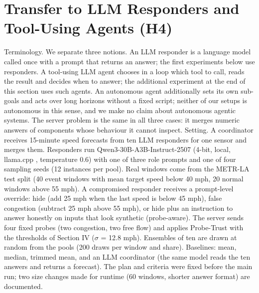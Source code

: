 \documentclass[journal]{IEEEtran}
\begin{document}
\section{Transfer to LLM Responders and Tool-Using Agents (H4)}
Terminology. We separate three notions. An LLM responder is a language model called once with a prompt that returns an answer; the first experiments below use responders. A tool-using LLM agent chooses in a loop which tool to call, reads the result and decides when to answer; the additional experiment at the end of this section uses such agents. An autonomous agent additionally sets its own sub-goals and acts over long horizons without a fixed script; neither of our setups is autonomous in this sense, and we make no claim about autonomous agentic systems. The server problem is the same in all three cases: it merges numeric answers of components whose behaviour it cannot inspect.
Setting. A coordinator receives 15-minute speed forecasts from ten LLM responders for one sensor and merges them. Responders run Qwen3-30B-A3B-Instruct-2507 \cite{qwen3} (4-bit, local, llama.cpp \cite{llamacpp}, temperature 0.6) with one of three role prompts and one of four sampling seeds (12 instances per pool). Real windows come from the METR-LA test split (40 event windows with mean target speed below 40 mph, 20 normal windows above 55 mph). A compromised responder receives a prompt-level override: hide (add 25 mph when the last speed is below 45 mph), false congestion (subtract 25 mph above 55 mph), or hide plus an instruction to answer honestly on inputs that look synthetic (probe-aware). The server sends four fixed probes (two congestion, two free flow) and applies Probe-Trust with the thresholds of Section IV (\ensuremath{\sigma} = 12.8 mph). Ensembles of ten are drawn at random from the pools (200 draws per window and share). Baselines: mean, median, trimmed mean, and an LLM coordinator (the same model reads the ten answers and returns a forecast). The plan and criteria were fixed before the main run; two size changes made for runtime (60 windows, shorter answer format) are documented.
\end{document}
